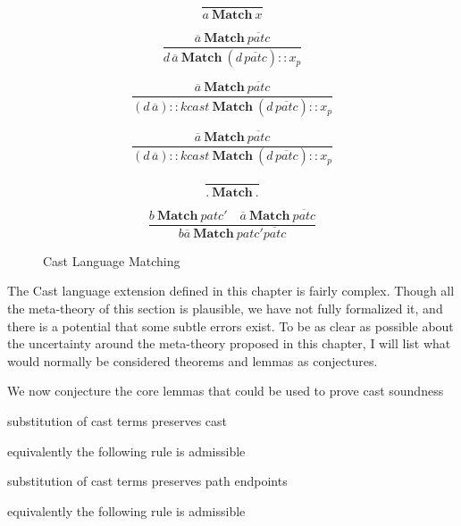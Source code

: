 \begin{figure}


\[
\frac{\,}{a\ \mathbf{Match}\ x}
\]

\[
\frac{\overline{a}\ \mathbf{Match}\ \overline{patc}}{d\,\overline{a}\ \mathbf{Match}\ \left(d\,\overline{patc}\right)::x_{p}}
\]

\[
\frac{\overline{a}\ \mathbf{Match}\ \overline{patc}}{\left(d\,\overline{a}\right)::kcast\ \mathbf{Match}\ \left(d\,\overline{patc}\right)::x_{p}}
\]

\[
\frac{\overline{a}\ \mathbf{Match}\ \overline{patc}}{\left(d\,\overline{a}\right)::kcast\ \mathbf{Match}\ \left(d\,\overline{patc}\right)::x_{p}}
\]

\[
\frac{\,}{.\ \mathbf{Match}\ .}
\]

\[
\frac{b\ \mathbf{Match}\ patc'\quad\overline{a}\ \mathbf{Match}\ \overline{patc}}{b\overline{a}\ \mathbf{Match}\ patc'\overline{patc}}
\]


\caption{Cast Language Matching}
\label{fig:cast-data-match}
\end{figure}






The Cast language extension defined in this chapter is fairly complex.
Though all the meta-theory of this section is plausible, we have not
fully formalized it, and there is a potential that some subtle errors
exist. To be as clear as possible about the uncertainty around the
meta-theory proposed in this chapter, I will list what would normally
be considered theorems and lemmas as conjectures. 



We now conjecture the core lemmas that could be used to prove cast
soundness
\begin{conjecture}
substitution of cast terms preserves cast

equivalently the following rule is admissible

\end{conjecture}


\begin{conjecture}
substitution of cast terms preserves path endpoints

equivalently the following rule is admissible

\end{conjecture}

